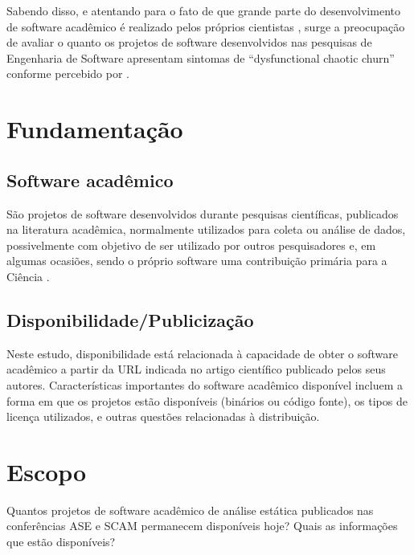 Sabendo disso, e atentando para o fato de que grande parte do desenvolvimento
de software acadêmico é realizado pelos próprios cientistas
\cite{hettrick2014uk, momcheva2015software}, surge a preocupação de avaliar o
quanto os projetos de software desenvolvidos nas pesquisas de Engenharia de
Software apresentam sintomas de ``dysfunctional chaotic churn'' conforme
percebido por .


\section{Fundamentação} \label{estudo1:fundamentacao} %

\subsection{Software acadêmico}

São projetos de software desenvolvidos durante pesquisas científicas,
publicados na literatura acadêmica, normalmente utilizados para coleta ou
análise de dados, possivelmente com objetivo de ser utilizado por outros
pesquisadores e, em algumas ocasiões, sendo o próprio software uma contribuição
primária para a Ciência \cite{howison2011scientific}.

\subsection{Disponibilidade/Publicização}


Neste estudo, disponibilidade está relacionada à capacidade de obter o software acadêmico
a partir da URL indicada no artigo científico publicado pelos seus autores.
Características importantes do software acadêmico disponível 
incluem a forma em que os projetos estão disponíveis (binários ou código fonte), 
os tipos de licença utilizados, e outras questões relacionadas à distribuição.


\section{Escopo} \label{estudo1:definicao} %

Quantos projetos de software acadêmico de análise estática publicados
nas conferências ASE e SCAM permanecem disponíveis
hoje? Quais as informações que estão disponíveis?

